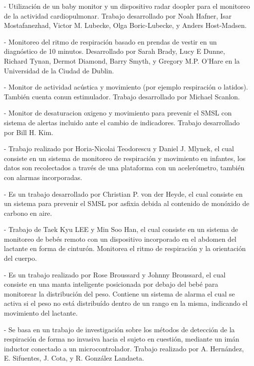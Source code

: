\documentclass{IEEEtran}
\begin{document}
		\cite{hafner2007non} - Utilización de un baby monitor y un dispositivo radar doopler para el monitoreo de la actividad cardiopulmonar. Trabajo desarrollado por Noah Hafner, Isar Mostafanezhad, Victor M. Lubecke, Olga Boric-Lubecke, y Anders Host-Madsen.

		\cite{brady2005garment} - Monitoreo del ritmo de respiración basado en prendas de vestir en un diagnóstico de 10 minutos. Desarrollado por Sarah Brady, Lucy E Dunne, Richard Tynan, Dermot Diamond, Barry Smyth, y Gregory M.P. O’Hare en la Universidad de la Ciudad de Dublin.

		\cite{scanlon1996sudden} - Monitor de actividad acústica y movimiento (por ejemplo respiración o latidos). También cuenta conun estimulador. Trabajo desarrollado por Michael Scanlon.

		\cite{kim1996sudden} - Monitor de desaturacion oxigeno y movimiento para prevenir el SMSL con sistema de alertas incluido ante el cambio de indicadores. Trabajo desarrollado por Bill H. Kim.

		\cite{teodorescu2000respiration} - Trabajo realizado por Horia-Nicolai Teodorescu y Daniel J. Mlynek, el cual consiste en un sistema de monitoreo de respiración y movimiento en infantes, los datos son recolectados a través de una plataforma con un acelerómetro, también con alarmas incorporadas.

		\cite{christian1999apparatus} - Es un trabajo desarrollado por Christian P. von der Heyde, el cual consiste en un sistema para prevenir el SMSL por asfixia debida al contenido de monóxido de carbono en aire.

		\cite{lee2012baby} - Trabajo de Taek Kyu LEE y Min Soo Han, el cual consiste en un sistema de monitoreo de bebés remoto con un dispositivo incorporado en el abdomen del lactante en forma de cinturón. Monitorea el ritmo de respiración y la orientación del cuerpo.

		\cite{broussard2002baby} - Es un trabajo realizado por Rose Broussard y Johnny Broussard, el cual consiste en una manta inteligente posicionada por debajo del bebé para monitorear la distribución del peso. Contiene un sistema de alarma el cual se activa si el peso no está distribuído dentro de un rango en la misma, indicando el movimiento del lactante.

		\cite{hernandez2017deteccion} - Se basa en un trabajo de investigación sobre los métodos de detección de la respiración de forma no invasiva hacia el sujeto en cuestión, mediante un imán inductor conectado a un microcontrolador. Trabajo realizado por A. Hernández, E. Sifuentes, J. Cota, y R. González Landaeta.
\end{document}

